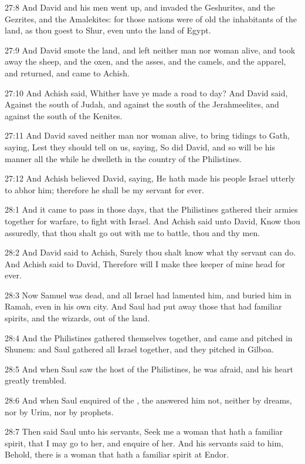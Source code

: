 27:8 And David and his men went up, and invaded the Geshurites, and the Gezrites, and the Amalekites: for those nations were of old the inhabitants of the land, as thou goest to Shur, even unto the land of Egypt.

27:9 And David smote the land, and left neither man nor woman alive, and took away the sheep, and the oxen, and the asses, and the camels, and the apparel, and returned, and came to Achish.

27:10 And Achish said, Whither have ye made a road to day? And David said, Against the south of Judah, and against the south of the Jerahmeelites, and against the south of the Kenites.

27:11 And David saved neither man nor woman alive, to bring tidings to Gath, saying, Lest they should tell on us, saying, So did David, and so will be his manner all the while he dwelleth in the country of the Philistines.

27:12 And Achish believed David, saying, He hath made his people Israel utterly to abhor him; therefore he shall be my servant for ever.

28:1 And it came to pass in those days, that the Philistines gathered their armies together for warfare, to fight with Israel. And Achish said unto David, Know thou assuredly, that thou shalt go out with me to battle, thou and thy men.

28:2 And David said to Achish, Surely thou shalt know what thy servant can do. And Achish said to David, Therefore will I make thee keeper of mine head for ever.

28:3 Now Samuel was dead, and all Israel had lamented him, and buried him in Ramah, even in his own city. And Saul had put away those that had familiar spirits, and the wizards, out of the land.

28:4 And the Philistines gathered themselves together, and came and pitched in Shunem: and Saul gathered all Israel together, and they pitched in Gilboa.

28:5 And when Saul saw the host of the Philistines, he was afraid, and his heart greatly trembled.

28:6 And when Saul enquired of the \LORD, the \LORD answered him not, neither by dreams, nor by Urim, nor by prophets.

28:7 Then said Saul unto his servants, Seek me a woman that hath a familiar spirit, that I may go to her, and enquire of her. And his servants said to him, Behold, there is a woman that hath a familiar spirit at Endor.

